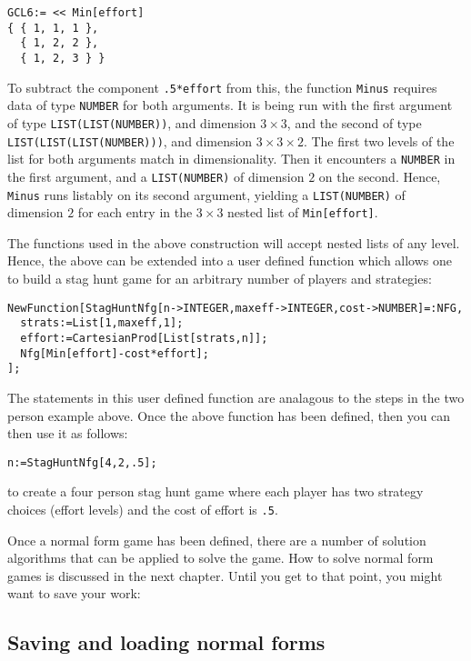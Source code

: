 \begin{verbatim}
GCL6:= << Min[effort]
{ { 1, 1, 1 },
  { 1, 2, 2 },
  { 1, 2, 3 } }
\end{verbatim}

\noindent
To subtract the component \verb+.5*effort+ from this, the function
\verb+Minus+ requires data of type \verb+NUMBER+ for both arguments.
It is being run with the first argument of type
\verb+LIST(LIST(NUMBER))+, and dimension $3\times 3$, and the second of
type \verb+LIST(LIST(LIST(NUMBER)))+, and dimension $3\times 3\times
2$.  The first two levels of the list for both arguments match
in dimensionality.  Then it encounters a \verb+NUMBER+ in the first
argument, and a \verb+LIST(NUMBER)+ of dimension $2$ on the second.
Hence, \verb+Minus+ runs listably on its second argument, yielding a
\verb+LIST(NUMBER)+ of dimension $2$ for each entry in the $3\times 3$
nested list of \verb+Min[effort]+. 

The functions used in the above construction will accept nested lists
of any level.  Hence, the above can be extended into a user defined
function which allows one to build a stag hunt game for an arbitrary
number of players and strategies:

\begin{verbatim}
NewFunction[StagHuntNfg[n->INTEGER,maxeff->INTEGER,cost->NUMBER]=:NFG,
  strats:=List[1,maxeff,1];
  effort:=CartesianProd[List[strats,n]];
  Nfg[Min[effort]-cost*effort];
];
\end{verbatim}

\noindent
The statements in this user defined function are analagous to the
steps in the two person example above.  Once the above function has
been defined, then you can then use it as follows:

\begin{verbatim}
n:=StagHuntNfg[4,2,.5];
\end{verbatim}

\noindent
to create a four person stag hunt game where each player has two
strategy choices (effort levels) and the cost of effort is \verb+.5+.

Once a normal form game has been defined, there are a number of
solution algorithms that can be applied to solve the game.  How to
solve normal form games is discussed in the next chapter.  Until you
get to that point, you might want to save your work:

\subsection{Saving and loading normal forms}

